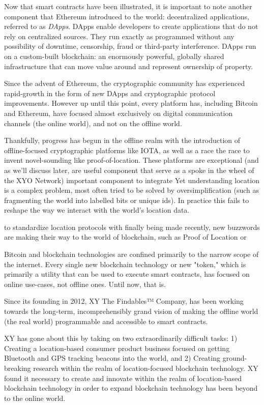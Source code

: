 \documentclass{article}
\begin{document}
Now that smart contracts have been illustrated, it is important to note another component that Ethereum introduced to the world: decentralized applications, referred to as \textit{DApps}. DApps enable developers to create applications that do not rely on centralized sources. They run exactly as programmed without any possibility of downtime, censorship, fraud or third-party interference. DApps run on a custom-built blockchain: an enormously powerful, globally shared infrastructure that can move value around and represent ownership of property.

Since the advent of Ethereum, the cryptographic community has experienced rapid-growth in the form of new DApps and  cryptographic protocol improvements. However up until this point, every platform has, including Bitcoin and Ethereum, have focused almost exclusively on digital communication channels (the online world), and not on the offline world.

Thankfully, progress has begun in the offline realm with the introduction of offline-focused cryptographic platforms like IOTA, as well as a race the race to invent novel-sounding like \Gls{proof-of-location}. These platforms are exceptional (and as we'll discuss later, are useful component that serve as a spoke in the wheel of the XYO Network) important component to integrate Yet understanding location is a complex problem, most often tried to be solved by oversimplification (such as fragmenting the world into labelled bits or unique ids). In practice this fails to reshape the way we interact with the world's location data. 

 to standardize location protocols with finally being made  recently, new buzzwords are making their way to the world of blockchain, such as Proof of Location or 

Bitcoin and blockchain technologies are confined primarily to the narrow scope of the internet. Every single new blockchain technology or new "token," which is primarily a utility that can be used to execute smart contracts, has focused on online use-cases, not offline ones. Until now, that is.

Since its founding in 2012, XY The Findables™ Company, has been working towards the long-term, incomprehensibly grand vision of making the offline world (the real world) programmable and accessible to smart contracts. 

XY has gone about this by taking on two extraordinarily difficult tasks: 1) Creating a location-based consumer product business focused on getting Bluetooth and GPS tracking beacons into the world, and 2) Creating ground-breaking research within the realm of location-focused blockchain technology. XY found it necessary to create and innovate within the realm of location-based blockchain technology in order to expand blockchain technology has been beyond to the online world.
\end{document}
